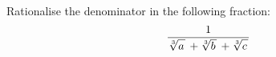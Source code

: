 Rationalise the denominator in the following fraction:
\begin{equation*}
  \frac{1}{ \mspace{1mu}
           \sqrt[3]{a \vphantom{bc} \mspace{2mu}} \,
           + \sqrt[3]{b \vphantom{ac} \mspace{2mu}} \,
           + \sqrt[3]{c \vphantom{ab} \mspace{2mu}}
          \mspace{1mu} }
\end{equation*}
